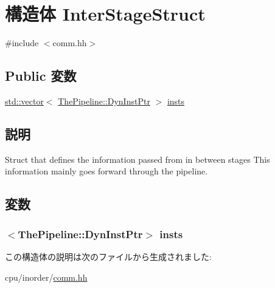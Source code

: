 \hypertarget{structInterStageStruct}{
\section{構造体 InterStageStruct}
\label{structInterStageStruct}
}


{\ttfamily \#include $<$comm.hh$>$}\subsection*{Public 変数}
\begin{DoxyCompactItemize}
\item 
\hyperlink{classstd_1_1vector}{std::vector}$<$ \hyperlink{classRefCountingPtr}{ThePipeline::DynInstPtr} $>$ \hyperlink{structInterStageStruct_a85e189531dbcc85517aeb71ec3510536}{insts}
\end{DoxyCompactItemize}


\subsection{説明}
Struct that defines the information passed from in between stages This information mainly goes forward through the pipeline. 

\subsection{変数}
\hypertarget{structInterStageStruct_a85e189531dbcc85517aeb71ec3510536}{
\subsubsection[{insts}]{$<${\bf ThePipeline::DynInstPtr}$>$ {\bf insts}}}
\label{structInterStageStruct_a85e189531dbcc85517aeb71ec3510536}


この構造体の説明は次のファイルから生成されました:\begin{DoxyCompactItemize}
\item 
cpu/inorder/\hyperlink{inorder_2comm_8hh}{comm.hh}\end{DoxyCompactItemize}
